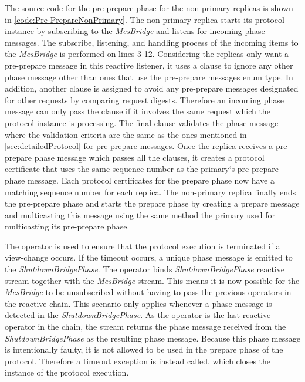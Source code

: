 The source code for the pre-prepare phase for the non-primary replicas is shown in \autoref{code:Pre-PrepareNonPrimary}. The non-primary replica starts its protocol instance by subscribing to the  \emph{MesBridge} and listens for incoming phase messages. The subscribe, listening, and handling process of the incoming items to the \emph{MesBridge} is performed on lines 3-12. Considering the replicas only want a pre-prepare message in this reactive listener, it uses a  clause to ignore any other phase message other than ones that use the pre-prepare messages enum type. In addition, another  clause is assigned to avoid any pre-prepare messages designated for other requests by comparing request digests. Therefore an incoming phase message can only pass the  clause if it involves the same request which the protocol instance is processing. The final  clause validates the phase message where the validation criteria are the same as the ones mentioned in \autoref{sec:detailedProtocol} for pre-prepare messages. Once the replica receives a pre-prepare phase message which passes all the  clauses, it creates a protocol certificate that uses the same sequence number as the primary`s pre-prepare phase message. Each protocol certificates for the prepare phase now have a matching sequence number for each replica. The non-primary replica finally ends the pre-prepare phase and starts the prepare phase by creating a prepare message and multicasting this message using the same method the primary used for multicasting its pre-prepare phase.

The  operator is used to ensure that the protocol execution is terminated if a view-change occurs. If the timeout occurs, a unique phase message is emitted to the  \emph{ShutdownBridgePhase}. The  operator binds \emph{ShutdownBridgePhase} reactive stream together with the \emph{MesBridge} stream. This means it is now possible for the \emph{MesBridge} to be unsubscribed without having to pass the previous operators in the reactive chain. This scenario only applies whenever a phase message is detected in the \emph{ShutdownBridgePhase}. As the  operator is the last reactive operator in the chain, the stream returns the phase message received from the \emph{ShutdownBridgePhase} as the resulting phase message. Because this phase message is intentionally faulty, it is not allowed to be used in the prepare phase of the protocol. Therefore a timeout exception is instead called, which closes the instance of the protocol execution.

